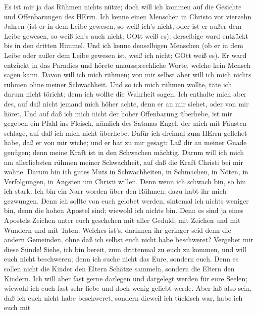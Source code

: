  Es ist mir ja das Rühmen nichts nütze; doch will ich kommen
auf die Gesichte und Offenbarungen des HErrn.  Ich kenne
einen Menschen in Christo vor vierzehn Jahren (ist er in dem Leibe
gewesen, so weiß ich's nicht, oder ist er außer dem Leibe gewesen, so
weiß ich's auch nicht; GOtt weiß es); derselbige ward entzückt bis in
den dritten Himmel.  Und ich kenne denselbigen Menschen (ob
er in dem Leibe oder außer dem Leibe gewesen ist, weiß ich nicht; GOtt
weiß es).  Er ward entzückt in das Paradies und hörete
unaussprechliche Worte, welche kein Mensch sagen kann. 
Davon will ich mich rühmen; von mir selbst aber will ich mich nichts
rühmen ohne meiner Schwachheit.  Und so ich mich rühmen
wollte, täte ich darum nicht töricht; denn ich wollte die Wahrheit
sagen. Ich enthalte mich aber des, auf daß nicht jemand mich höher
achte, denn er an mir siehet, oder von mir höret,  Und auf
daß ich mich nicht der hoher Offenbarung überhebe, ist mir gegeben ein
Pfahl ins Fleisch, nämlich des Satanas Engel, der mich mit Fäusten
schlage, auf daß ich mich nicht überhebe.  Dafür ich dreimal
zum HErrn geflehet habe, daß er von mir wiche;  und er hat
zu mir gesagt: Laß dir an meiner Gnade genügen; denn meine Kraft ist in
den Schwachen mächtig. Darum will ich mich am allerliebsten rühmen
meiner Schwachheit, auf daß die Kraft Christi bei mir wohne.
 Darum bin ich gutes Muts in Schwachheiten, in Schmachen,
in Nöten, in Verfolgungen, in Ängsten um Christi willen. Denn wenn ich
schwach bin, so bin ich stark.  Ich bin ein Narr worden
über den Rühmen; dazu habt ihr mich gezwungen. Denn ich sollte von euch
gelobet werden, sintemal ich nichts weniger bin, denn die hohen Apostel
sind; wiewohl ich nichts bin.  Denn es sind ja eines
Apostels Zeichen unter euch geschehen mit aller Geduld; mit Zeichen und
mit Wundern und mit Taten.  Welches ist's, darinnen ihr
geringer seid denn die andern Gemeinden, ohne daß ich selbst euch nicht
habe beschweret? Vergebet mir diese Sünde!  Siehe, ich bin
bereit, zum drittenmal zu euch zu kommen, und will euch nicht
beschweren; denn ich suche nicht das Eure, sondern euch. Denn es sollen
nicht die Kinder den Eltern Schätze sammeln, sondern die Eltern den
Kindern.  Ich will aber fast gerne darlegen und dargelegt
werden für eure Seelen; wiewohl ich euch fast sehr liebe und doch wenig
geliebt werde.  Aber laß also sein, daß ich euch nicht habe
beschweret, sondern dieweil ich tückisch war, habe ich euch mit
